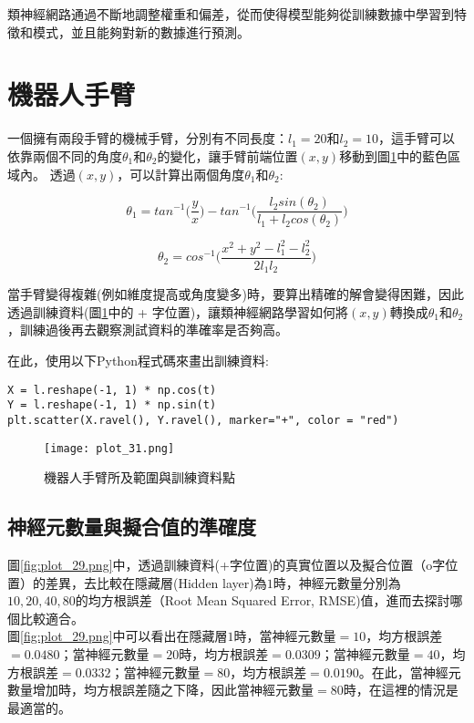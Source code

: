 \documentclass[12pt, a4paper]{article}
\begin{document}
類神經網路通過不斷地調整權重和偏差，從而使得模型能夠從訓練數據中學習到特徵和模式，並且能夠對新的數據進行預測。



\section{機器人手臂}
一個擁有兩段手臂的機械手臂，分別有不同長度\;：\;$l_1 = 20$\;和\;$l_2 = 10$\;，這手臂可以依靠兩個不同的角度\;$\theta_1$\;和\;$\theta_2$\;的變化，讓手臂前端位置\;$(x, y)$\;移動到圖\;\ref{fig:plot_31.png}\;中的藍色區域內。
透過\;$(x, y)$\;，可以計算出兩個角度\;$\theta_1$\;和\;$\theta_2$\;:

\begin{equation}
\theta_1 = tan^{-1}\big(\frac{y}{x} \big)-tan^{-1}\big(\frac{l_2sin(\theta_2)}{l_1+l_2cos(\theta_2)} \big)
\end{equation}

\begin{equation}
\theta_2 = cos^{-1}\big(\frac{x^2+y^2-l_1^2-l_2^2}{2l_1l_2} \big)
\end{equation}

當手臂變得複雜(例如維度提高或角度變多)時，要算出精確的解會變得困難，因此透過訓練資料(圖\;\ref{fig:plot_31.png}\;中的 + 字位置)，讓類神經網路學習如何將\;$(x, y)$\;轉換成\;$\theta_1$\;和\;$\theta_2$\;，訓練過後再去觀察測試資料的準確率是否夠高。

在此，使用以下Python程式碼來畫出訓練資料\;:
\begin{lstlisting}
X = l.reshape(-1, 1) * np.cos(t)
Y = l.reshape(-1, 1) * np.sin(t)
plt.scatter(X.ravel(), Y.ravel(), marker="+", color = "red")
\end{lstlisting}

\begin{figure}[H]
\centering
\texttt{[image: plot\_31.png]}
\caption{機器人手臂所及範圍與訓練資料點}
\label{fig:plot_31.png}
\end{figure}

\subsection{神經元數量與擬合值的準確度}
圖\;\ref{fig:plot_29.png}\;中，透過訓練資料(+字位置)的真實位置以及擬合位置（o字位置）的差異，去比較在隱藏層(Hidden layer)為\;$1$\;時，神經元數量分別為\;$10,20,40,80$\;的均方根誤差（Root Mean Squared Error, RMSE)值，進而去探討哪個比較適合。\\
圖\;\ref{fig:plot_29.png}\;中可以看出在隱藏層\;$1$\;時，當神經元數量\;$=10$\;，均方根誤差\;$=0.0480$\;；當神經元數量\;$=20$\;時，均方根誤差\;$=0.0309$\;；當神經元數量\;$=40$\;，均方根誤差\;$=0.0332$\;；當神經元數量\;$=80$\;，均方根誤差\;$=0.0190$\;。在此，當神經元數量增加時，均方根誤差隨之下降，因此當神經元數量\;$=80$\;時，在這裡的情況是最適當的。
\end{document}
